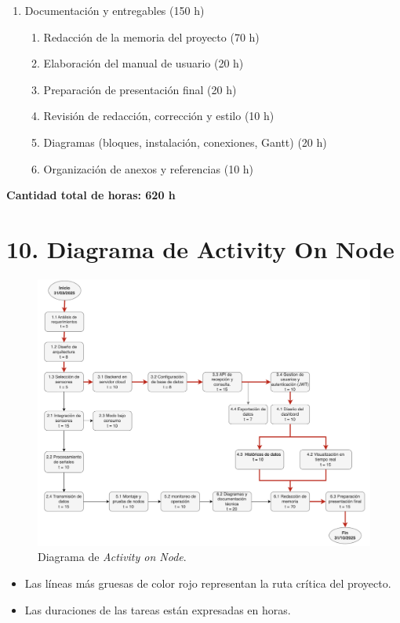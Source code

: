\documentclass[
11pt, %
]{charter}
\begin{document}
\begin{enumerate}
    \item Documentación y entregables (150 h)
    \begin{enumerate}
        \item Redacción de la memoria del proyecto (70 h) 
        \item Elaboración del manual de usuario (20 h) 
        \item Preparación de presentación final (20 h) 
        \item Revisión de redacción, corrección y estilo (10 h) 
        \item Diagramas (bloques, instalación, conexiones, Gantt) (20 h) 
        \item Organización de anexos y referencias (10 h) 
    \end{enumerate}
\end{enumerate}

\textbf{Cantidad total de horas: 620 h}

\newpage
\section{10. Diagrama de Activity On Node}
\label{sec:AoN}

\begin{figure}[htpb]
\centering 
\includegraphics[width=1.05\textwidth]{./Figuras/AoN.png}
\caption{Diagrama de \textit{Activity on Node}.}
\label{fig:AoN}
\end{figure}
\begin{itemize}
    \item Las líneas más gruesas de color rojo representan la ruta crítica del proyecto.
    \item Las duraciones de las tareas están expresadas en horas.
\end{itemize}
\end{document}
